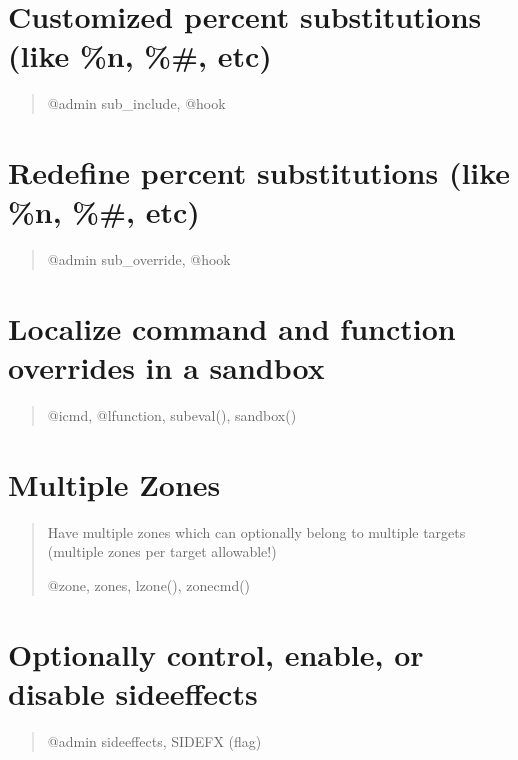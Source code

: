 \documentclass[letterpaper,10pt,english]{sphinxmanual}
\begin{document}
\section{Customized percent substitutions (like \%n, \%\#, etc)}
\label{\detokenize{features:customized-percent-substitutions-like-n-etc}}\begin{quote}

\sphinxAtStartPar
@admin sub\_include, @hook
\end{quote}


\section{Redefine percent substitutions (like \%n, \%\#, etc)}
\label{\detokenize{features:redefine-percent-substitutions-like-n-etc}}\begin{quote}

\sphinxAtStartPar
@admin sub\_override, @hook
\end{quote}


\section{Localize command and function overrides in a sandbox}
\label{\detokenize{features:localize-command-and-function-overrides-in-a-sandbox}}\begin{quote}

\sphinxAtStartPar
@icmd, @lfunction, subeval(), sandbox()
\end{quote}


\section{Multiple Zones}
\label{\detokenize{features:multiple-zones}}\begin{quote}

\sphinxAtStartPar
Have multiple zones which can optionally belong to multiple targets (multiple zones per target allowable!)

\sphinxAtStartPar
@zone, zones, lzone(), zonecmd()
\end{quote}


\section{Optionally control, enable, or disable sideeffects}
\label{\detokenize{features:optionally-control-enable-or-disable-sideeffects}}\begin{quote}

\sphinxAtStartPar
@admin sideeffects, SIDEFX (flag)
\end{quote}
\end{document}
